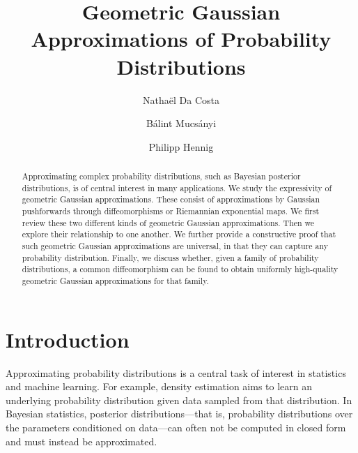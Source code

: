\documentclass[runningheads,orivec]{llncs}
\begin{document}
%
\title{Geometric Gaussian Approximations of Probability Distributions}
%
%
\author{Nathaël Da Costa%
\and
Bálint Mucsányi%
\and
Philipp Hennig}%
%
%
%
\maketitle              %
%
\begin{abstract}
Approximating complex probability distributions, such as Bayesian posterior distributions, is of central interest in many applications. We study the expressivity of geometric Gaussian approximations. These consist of approximations by Gaussian pushforwards through diffeomorphisms or Riemannian exponential maps. We first review these two different kinds of geometric Gaussian approximations. Then we explore their relationship to one another. We further provide a constructive proof that such geometric Gaussian approximations are universal, in that they can capture any probability distribution. Finally, we discuss whether, given a family of probability distributions, a common diffeomorphism can be found to obtain uniformly high-quality geometric Gaussian approximations for that family.

\end{abstract}
%
%
%
\section{Introduction}
Approximating probability distributions is a central task of interest in statistics and machine learning. For example, density estimation aims to learn an underlying probability distribution given data sampled from that distribution. In Bayesian statistics, posterior distributions---that is, probability distributions over the parameters conditioned on data---can often not be computed in closed form and must instead be approximated.
\end{document}

